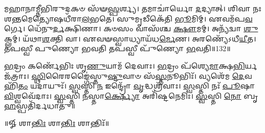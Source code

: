 𑌮𑌹𑌾𑌨𑌾𑌮𑍍𑌨𑍀𑌭𑌿𑌰𑍁𑌦𑌕𑍞 𑌸᳴𑍟\-\ul{𑌸𑍍𑌪}\-𑌰𑍍𑌶𑍍𑌯। 𑌤𑌮𑌾𑌚𑌾॑𑌰𑍍𑌯𑍋 \ul{𑌦}\-𑌦𑍍𑌯𑌾𑌤𑍍। 
𑌶𑌿𑌵𑌾 𑌨𑌃 𑌶𑌨𑍍𑌤𑌮𑍇𑌤𑍍𑌯𑍋𑌷𑌧𑍀᳴𑌰𑌾\-\ul{𑌲}\-𑌭𑌤𑍇। 𑌸𑍁𑌮𑍃𑌡𑍀𑌕𑍇᳴𑌤𑌿 \ul{𑌭𑍂}\-𑌮𑌿𑌮𑍍। 
𑌏𑌵𑌮᳴𑌪\-\ul{𑌵}\-𑌰𑍍𑌗𑍇। 𑌧𑍇᳴𑌨𑍁\-\ul{𑌰𑍍𑌦}\-𑌕𑍍𑌷𑌿𑌣𑌾। 𑌕𑍞𑌸𑌂 𑌵𑌾𑌸᳴𑌶𑍍𑌚 \ul{𑌕𑍍𑌷𑍗}\-𑌮𑌮𑍍। 
𑌅𑌨𑍍𑌯᳴𑌦𑍍𑌵𑌾 \ul{𑌶𑍁}\-𑌕𑍍𑌲𑌮𑍍। 𑌯᳴𑌥𑌾\-\ul{𑌶}\-𑌕𑍍𑌤𑌿 𑌵𑌾। 𑌏𑌵𑍟𑌸𑍍𑌵𑌾𑌧𑍍𑌯𑌾𑌯᳴𑌧\-\ul{𑌰𑍍𑌮𑍇}\-𑌣। 
𑌅𑌰𑌣𑍍𑌯𑍇᳴𑌽𑌧𑍀\-\ul{𑌯𑍀}\-𑌤। 𑌤𑌪𑌸𑍍𑌵𑍀 𑌪𑍁𑌣𑍍𑌯𑍋 𑌭𑌵𑌤𑌿 𑌤𑌪𑌸𑍍𑌵𑍀 𑌪𑍁᳴𑌣𑍍𑌯𑍋 \ul{𑌭}\-𑌵𑌤𑌿॥132॥\anuvakamend


\-\ul{𑌭}\-𑌦𑍍𑌰𑌂 𑌕𑌰𑍍𑌣𑍇᳴𑌭𑌿𑌃 𑌶𑍃\-\ul{𑌣𑍁}\-𑌯𑌾𑌮᳴ 𑌦𑍇𑌵𑌾𑌃। \ul{𑌭}\-𑌦𑍍𑌰𑌂 𑌪᳴𑌶𑍍𑌯𑍇\-\ul{𑌮𑌾}\-𑌕𑍍𑌷\-\ul{𑌭𑌿}\-𑌰𑍍𑌯𑌜᳴𑌤𑍍𑌰𑌾𑌃। 
\-\ul{𑌸𑍍𑌥𑌿}\-𑌰𑍈𑌰𑌙𑍍𑌗𑍈॑𑌸𑍍𑌤𑍁\-\ul{𑌷𑍍𑌟𑍁}\-𑌵𑌾𑍞 𑌸᳴\-\ul{𑌸𑍍𑌤}\-𑌨𑍂𑌭𑌿𑌃᳴। 𑌵𑍍𑌯𑌶𑍇᳴𑌮 \ul{𑌦𑍇}\-𑌵𑌹𑌿᳴\-\ul{𑌤𑌂} 𑌯𑌦𑌾𑌯𑍁𑌃᳴। 
\-\ul{𑌸𑍍𑌵}\-𑌸𑍍𑌤𑌿 \ul{𑌨} 𑌇𑌨𑍍𑌦𑍍𑌰𑍋᳴ \ul{𑌵𑍃}\-𑌦𑍍𑌧𑌶𑍍𑌰᳴𑌵𑌾𑌃। \ul{𑌸𑍍𑌵}\-𑌸𑍍𑌤𑌿 𑌨𑌃᳴ \ul{𑌪𑍂}\-𑌷𑌾 \ul{𑌵𑌿}\-𑌶𑍍𑌵𑌵𑍇᳴𑌦𑌾𑌃। 
\-\ul{𑌸𑍍𑌵}\-𑌸𑍍𑌤𑌿 \ul{𑌨}\-𑌸𑍍𑌤𑌾\-\ul{𑌰𑍍𑌕𑍍𑌷𑍍𑌯𑍋} 𑌅𑌰𑌿᳴𑌷𑍍𑌟𑌨𑍇𑌮𑌿𑌃। \ul{𑌸𑍍𑌵}\-𑌸𑍍𑌤𑌿 \ul{𑌨𑍋} 𑌬𑍃\-\ul{𑌹}\-𑌸𑍍𑌪𑌤𑌿᳴𑌰𑍍𑌦𑌧𑌾𑌤𑍁॥\\

\centerline{॥𑍐 𑌶𑌾\-\ul{𑌨𑍍𑌤𑌿𑌃} 𑌶𑌾\-\ul{𑌨𑍍𑌤𑌿𑌃} 𑌶𑌾𑌨𑍍𑌤𑌿𑌃᳴॥}

